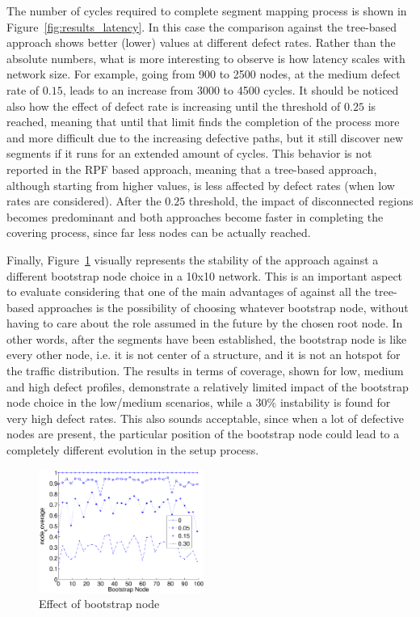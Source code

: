 The number of cycles required to complete segment mapping process
is shown in Figure~\ref{fig:results_latency}. In this case the comparison
against the tree-based approach shows better (lower) values at different defect
rates. Rather than the absolute numbers, what is more interesting
to observe is how \disr{} latency scales with network size. For example,
going from 900 to 2500 nodes, at the medium defect rate of $0.15$,
leads to an increase from 3000 to 4500 cycles. It should be noticed
also how the effect of defect rate is increasing until the threshold
of $0.25$ is reached, meaning that until that limit \disr{} finds 
the completion of the process more and more difficult due to the increasing defective
paths, but it still discover new segments if it runs for an
extended amount of cycles. This behavior is not reported in the RPF
based approach, meaning that a tree-based approach, although starting
from higher values, is less affected by defect rates (when low rates
are considered).
After the $0.25$ threshold, the impact of disconnected regions
becomes predominant and both approaches become faster in completing
the covering process, since far less nodes can be actually reached. 

Finally, Figure~\ref{fig:results_bootstrap} visually represents the
stability of the approach against a different bootstrap node choice
in a 10x10 network. This is an important aspect to evaluate 
considering that one of the main advantages of \disr{} against all the
tree-based approaches is the possibility of choosing whatever
bootstrap node, without having to care about the role assumed in the
future by the chosen root node. In other words, after the segments have
been established, the bootstrap node is like every other node, i.e. it
is not center of a structure, and it is not an hotspot for the traffic
distribution. The results in terms of coverage, shown for low, medium
and high defect profiles, demonstrate a relatively limited
impact of the bootstrap node choice in the low/medium scenarios, while a
$30\%$ instability is found for very high defect rates. This also
sounds acceptable, since when a lot of defective nodes are present, the
particular position of the bootstrap node could lead to a completely
different evolution in the \disr{} setup process.

\begin{figure}
\centering
\includegraphics[width=0.48\textwidth]{pictures/set3.eps}
\caption{Effect of bootstrap node}
\label{fig:results_bootstrap}
\end{figure}

